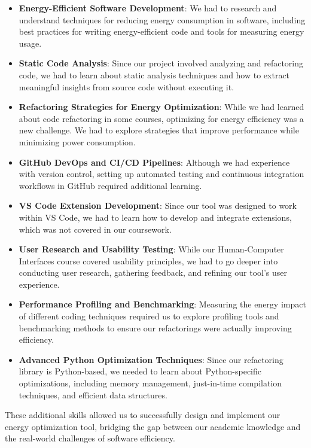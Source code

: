 \documentclass{article}
\begin{document}
\begin{itemize}
    \item \textbf{Energy-Efficient Software Development}: We had to research and understand techniques 
    for reducing energy consumption in software, including best practices for writing energy-efficient 
    code and tools for measuring energy usage.
    
    \item \textbf{Static Code Analysis}: Since our project involved analyzing and refactoring code, 
    we had to learn about static analysis techniques and how to extract meaningful insights from 
    source code without executing it.
    
    \item \textbf{Refactoring Strategies for Energy Optimization}: While we had learned about code 
    refactoring in some courses, optimizing for energy efficiency was a new challenge. We had to 
    explore strategies that improve performance while minimizing power consumption.
    
    \item \textbf{GitHub DevOps and CI/CD Pipelines}: Although we had experience with version control,
    setting up automated testing and continuous integration workflows in GitHub required additional 
    learning.
    
    \item \textbf{VS Code Extension Development}: Since our tool was designed to work within VS Code, 
    we had to learn how to develop and integrate extensions, which was not covered in our coursework.
    
    \item \textbf{User Research and Usability Testing}: While our Human-Computer Interfaces course 
    covered usability principles, we had to go deeper into conducting user research, gathering 
    feedback, and refining our tool's user experience.
    
    \item \textbf{Performance Profiling and Benchmarking}: Measuring the energy impact of different 
    coding techniques required us to explore profiling tools and benchmarking methods to ensure our 
    refactorings were actually improving efficiency.
    
    \item \textbf{Advanced Python Optimization Techniques}: Since our refactoring library is 
    Python-based, we needed to learn about Python-specific optimizations, including memory management, 
    just-in-time compilation techniques, and efficient data structures.
\end{itemize}

These additional skills allowed us to successfully design and implement our energy optimization tool, 
bridging the gap between our academic knowledge and the real-world challenges of software efficiency. 


~\newpage



\end{document}
